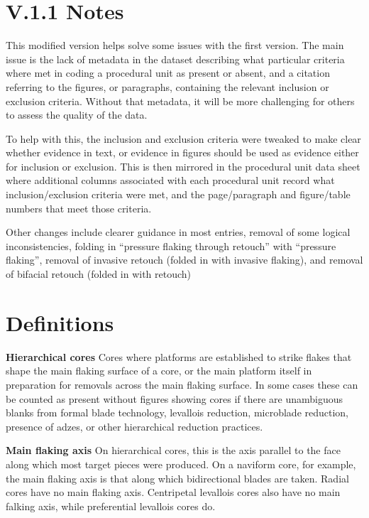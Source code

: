\documentclass[
]{article}
\begin{document}
\hypertarget{v.1.1-notes}{%
\section{V.1.1 Notes}\label{v.1.1-notes}}

This modified version helps solve some issues with the first version.
The main issue is the lack of metadata in the dataset describing what
particular criteria where met in coding a procedural unit as present or
absent, and a citation referring to the figures, or paragraphs,
containing the relevant inclusion or exclusion criteria. Without that
metadata, it will be more challenging for others to assess the quality
of the data.

To help with this, the inclusion and exclusion criteria were tweaked to
make clear whether evidence in text, or evidence in figures should be
used as evidence either for inclusion or exclusion. This is then
mirrored in the procedural unit data sheet where additional columns
associated with each procedural unit record what inclusion/exclusion
criteria were met, and the page/paragraph and figure/table numbers that
meet those criteria.

Other changes include clearer guidance in most entries, removal of some
logical inconsistencies, folding in ``pressure flaking through retouch''
with ``pressure flaking'', removal of invasive retouch (folded in with
invasive flaking), and removal of bifacial retouch (folded in with
retouch)

\hypertarget{definitions}{%
\section{Definitions}\label{definitions}}

\textbf{Hierarchical cores} Cores where platforms are established to
strike flakes that shape the main flaking surface of a core, or the main
platform itself in preparation for removals across the main flaking
surface. In some cases these can be counted as present without figures
showing cores if there are unambiguous blanks from formal blade
technology, levallois reduction, microblade reduction, presence of
adzes, or other hierarchical reduction practices.

\textbf{Main flaking axis} On hierarchical cores, this is the axis
parallel to the face along which most target pieces were produced. On a
naviform core, for example, the main flaking axis is that along which
bidirectional blades are taken. Radial cores have no main flaking axis.
Centripetal levallois cores also have no main falking axis, while
preferential levallois cores do.
\end{document}
